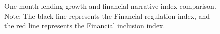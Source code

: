\documentclass[
  letterpaper,
  DIV=11,
  numbers=noendperiod]{scrartcl}
\begin{document}
\begin{figure}[H]


\caption{\label{fig-comp_narrative_indexes_one_month}One month lending
growth and financial narrative index comparison. Note: The black line
represents the Financial regulation index, and the red line represents
the Financial inclusion index.}

\end{figure}%

\newpage
\end{document}
